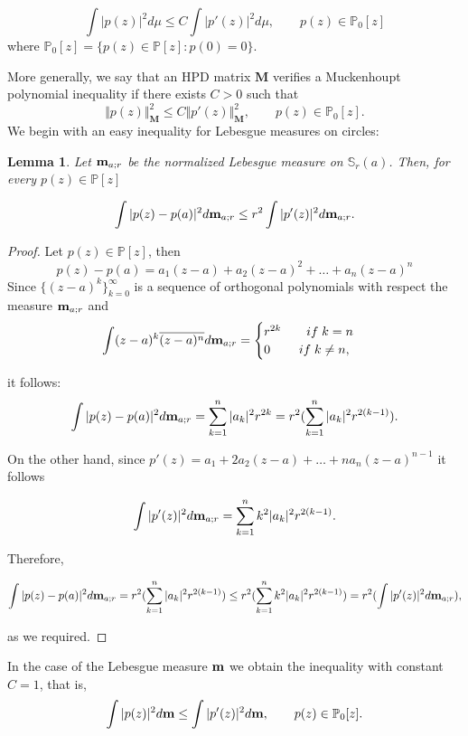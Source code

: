 \documentclass[12pt]{amsart}
\theoremstyle{definition}
\theoremstyle{plain}
\newtheorem{lem}{Lemma}
\theoremstyle{remark}
\begin{document}
$$
\int \vert p(z)\vert^2 d\mu \leq  C \int  \vert p'(z) \vert^2 d\mu, \qquad p(z) \in \mathbb{P}_0[z]
$$
\noindent where $\mathbb{P}_{0}[z]= \{p(z)\in \mathbb{P}[z] : p(0)=0\}$. 

\medskip 


\noindent More generally,  we say that an HPD matrix $\mathbf{M}$ verifies a Muckenhoupt polynomial inequality if there exists $C>0$ such that
$$
\Vert p(z) \Vert^{2}_{\mathbf{M}} \leq C \Vert p'(z) \Vert^{2}_{\mathbf{M}}, \qquad p(z) \in \mathbb{P}_0[z].
$$
 We begin with an easy inequality for Lebesgue measures on circles: 

\begin{lem} Let  ${\bf m}_{a;r}$ be the normalized Lebesgue measure on $\mathbb{S}_r(a)$. 
Then, for every $p(z)\in \mathbb{P}[z]$ 

$$
\int \vert p(z) -p(a)\vert^2 d {\bf m}_{a;r} \leq  r^{2} \int  \vert p'(z) \vert^2 d {\bf m}_{a;r}.
$$
\end{lem}
\begin{proof}  Let $p(z) \in \mathbb{P}[z]$, then 
$$
p(z)-p(a)=a_1(z-a)+a_2(z-a)^2+\dots+a_{n}(z-a)^{n}
$$
\noindent Since $\{(z-a)^k\}_{k=0}^{\infty}$ is a sequence of orthogonal polynomials with respect the measure ${\bf m}_{a;r}$ and  
$$
\int (z-a)^{k}\overline{(z-a)^{n}} d{\bf m}_{a;r}= \begin{cases} r^{2k} \qquad  if \; k=n \\ 0 \qquad \; if \; k\neq n,\end{cases} 
$$

\noindent it follows: 
$$
\int \vert p(z) -p(a) \vert^2 d{\bf m}_{a;r} = \sum_{k=1}^{n} \vert a_k \vert^2 r^{2k} =r^2(\sum_{k=1}^{n} \vert a_k \vert^2 r^{2(k-1)}).
$$

\noindent On the other hand, since $p'(z)=a_1+2a_2(z-a)+\dots+na_n(z-a)^{n-1}$ it follows 

$$
\int \vert p'(z) \vert^2 d{\bf m}_{a;r} = \sum_{k=1}^{n} k^2\vert a_k \vert^2 r^{2(k-1)}.
$$

\noindent Therefore, 

$$\int \vert p(z) -p(a)\vert^2 d{\bf m}_{a;r} =r^2(\sum_{k=1}^{n} \vert a_k \vert^2 r^{2(k-1)}) \leq  r^2(\sum_{k=1}^{n} k^2\vert a_k \vert^2 r^{2(k-1)})=r^2(\int \vert p'(z) \vert^2 d{\bf m}_{a;r}) ,
$$

\noindent as we required. 
\end{proof} 

\noindent  In the case of the Lebesgue measure ${\bf m}$ we obtain the inequality with constant $C=1$, that is,
$$
\int \vert p(z)\vert^{2} d{\bf m} \leq \int \vert p'(z) \vert^{2} d{\bf m}, \qquad p(z) \in \mathbb{P}_0[z].
$$
\end{document}
